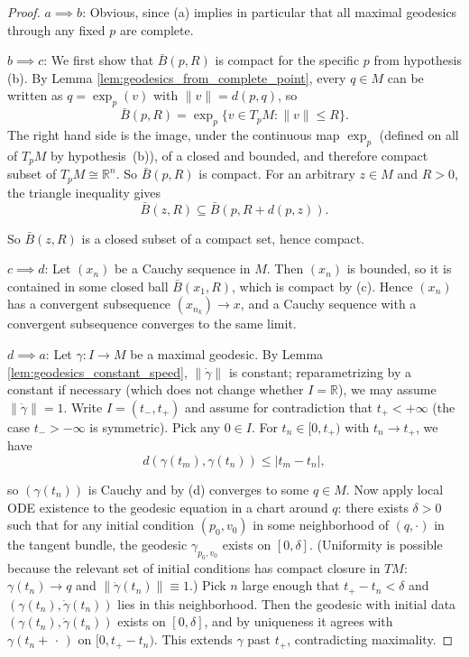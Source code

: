 \begin{proof}
$a \implies b$: Obvious, since (a) implies in particular that all maximal geodesics through any fixed $p$ are complete.

$b \implies c$: We first show that $\bar B(p, R)$ is compact for the specific $p$ from hypothesis (b). By Lemma \ref{lem:geodesics_from_complete_point}, every $q \in M$ can be written as $q = \exp_p(v)$ with $\|v\| = d(p,q)$, so 
\[
\bar{B}(p,R) = \exp_p\{v \in T_pM : \|v\| \leqslant R\}.
\]
The right hand side is the image, under the continuous map $\exp_p$ (defined on all of $T_pM$ by hypothesis~(b)), of a closed and bounded, and therefore compact subset of $T_pM \cong \mathbb{R}^n$. So $\bar B(p, R)$ is compact. For an arbitrary $z \in M$ and $R > 0$, the triangle inequality gives 
$$\bar B(z, R) \subseteq \bar B(p, R + d(p,z)).$$ 

So $\bar B(z, R)$ is a closed subset of a compact set, hence compact.

$c \implies d$: Let $(x_n)$ be a Cauchy sequence in $M$. Then $(x_n)$ is bounded, so it is contained in some closed ball $\bar B(x_1, R)$, which is compact by (c). Hence $(x_n)$ has a convergent subsequence $(x_{n_k}) \to x$, and a Cauchy sequence with a convergent subsequence converges to the same limit.

$d \implies a$: Let $\gamma \colon I \to M$ be a maximal geodesic. By Lemma \ref{lem:geodesics_constant_speed}, $\|\dot\gamma\|$ is constant; reparametrizing by a constant if necessary (which does not change whether $I = \mathbb{R}$), we may assume $\|\dot\gamma\| = 1$. Write $I = (t_-, t_+)$ and assume for contradiction that $t_+ < +\infty$ (the case $t_- > -\infty$ is symmetric). Pick any $0 \in I$. For $t_n \in [0, t_+)$ with $t_n \to t_+$, we have 
$$d(\gamma(t_m), \gamma(t_n)) \leqslant |t_m - t_n|,$$

so $(\gamma(t_n))$ is Cauchy and by (d) converges to some $q \in M$. Now apply local ODE existence to the geodesic equation in a chart around $q$: there exists $\delta > 0$ such that for any initial condition $(p_0, v_0)$ in some neighborhood of $(q, \cdot)$ in the tangent bundle, the geodesic $\gamma_{p_0, v_0}$ exists on $[0, \delta]$. (Uniformity is possible because the relevant set of initial conditions has compact closure in $TM$: $\gamma(t_n) \to q$ and $\|\dot\gamma(t_n)\| \equiv 1$.) Pick $n$ large enough that $t_+ - t_n < \delta$ and $(\gamma(t_n), \dot\gamma(t_n))$ lies in this neighborhood. Then the geodesic with initial data $(\gamma(t_n), \dot\gamma(t_n))$ exists on $[0, \delta]$, and by uniqueness it agrees with $\gamma(t_n + \,\cdot\,)$ on $[0, t_+ - t_n)$. This extends $\gamma$ past $t_+$, contradicting maximality.
\end{proof}






